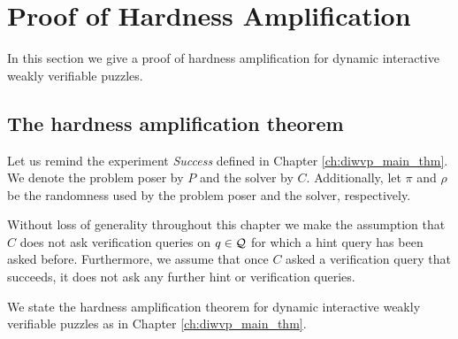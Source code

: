%
\section{Proof of Hardness Amplification}
In this section we give a proof of hardness amplification for dynamic interactive weakly verifiable puzzles.
\label{st:main_theorem}%
\subsection{The hardness amplification theorem}
\label{subst:main_theorem}%
Let us remind the experiment \textit{Success} defined in Chapter \ref{ch:diwvp_main_thm}.
We denote the problem poser by $P$ and the solver by $C$. Additionally, let $\pi$ and $\rho$ be the randomness used by
the problem poser and the solver, respectively.

\success*

Without loss of generality throughout this chapter we make the assumption that $C$ does not ask verification queries on $q \in \mathcal{Q}$
for which a hint query has been asked before. Furthermore, we assume that once $C$ asked
a verification query that succeeds, it does not ask any further hint or verification queries.

We state the hardness amplification theorem for dynamic interactive weakly verifiable puzzles as in Chapter \ref{ch:diwvp_main_thm}.
\hardnessAmpfDiwvp*
%
